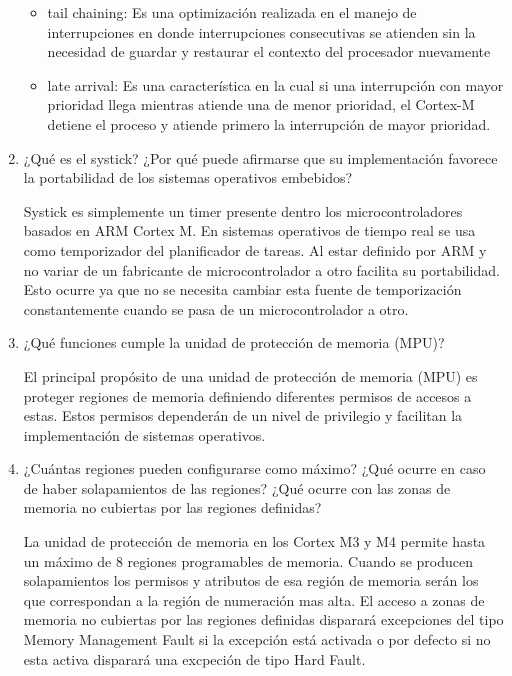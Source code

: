 \documentclass[12pt, a4paper]{article}
\makeatletter
\newcommand\setItemnumber[1]{\setcounter{enum\romannumeral\@enumdepth}{\numexpr#1-1\relax}}
\makeatother
\begin{document}
\begin{enumerate}
    \begin{itemize}
        \item tail chaining: Es una optimización realizada en el manejo de interrupciones en donde 
        interrupciones consecutivas se atienden sin la necesidad de guardar y restaurar el contexto del 
        procesador nuevamente  
        
        \item late arrival: Es una característica en la cual si una interrupción con mayor prioridad 
        llega mientras atiende una de menor prioridad, el Cortex-M detiene el proceso y atiende primero 
        la interrupción de mayor prioridad.
    \end{itemize}
    
    
    \setItemnumber{17}
    \item ¿Qué es el systick? ¿Por qué puede afirmarse que su implementación favorece la portabilidad 
    de los sistemas operativos embebidos?
    
    Systick es simplemente un timer presente dentro los microcontroladores basados en ARM Cortex M. 
    En sistemas operativos de tiempo real se usa como temporizador del planificador de tareas. Al 
    estar definido por ARM y no variar de un fabricante de microcontrolador a otro facilita
    su portabilidad. Esto ocurre ya que no se necesita cambiar esta fuente de temporización 
    constantemente cuando se pasa de un microcontrolador a otro.
    
    \setItemnumber{18}
    \item ¿Qué funciones cumple la unidad de protección de memoria (MPU)?
    
    El principal propósito de una unidad de protección de memoria (MPU) es proteger regiones de
    memoria definiendo diferentes permisos de accesos a estas. Estos permisos dependerán de un 
    nivel de privilegio y facilitan la implementación de sistemas operativos.
    
    \setItemnumber{19}
    \item¿Cuántas regiones pueden configurarse como máximo? ¿Qué ocurre en caso de haber solapamientos de 
    las regiones? ¿Qué ocurre con las zonas de memoria no cubiertas por las regiones definidas?
    
    La unidad de protección de memoria en los Cortex M3 y M4 permite hasta un máximo de 8 regiones 
    programables de memoria. Cuando se producen solapamientos los permisos y atributos de esa región de 
    memoria serán los que correspondan a la región de numeración mas alta. El acceso  a zonas de memoria 
    no cubiertas por las regiones definidas disparará excepciones del tipo Memory Management Fault si 
    la excepción está activada o por defecto si no esta activa disparará una excpeción de tipo Hard Fault.
    

\end{enumerate}
\end{document}
